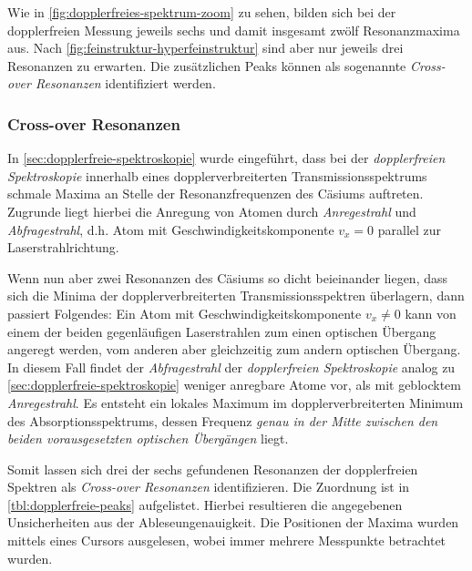 \documentclass[../bericht.tex]{subfiles}
\begin{document}
        Wie in \cref{fig:dopplerfreies-spektrum-zoom} zu sehen, bilden sich bei der dopplerfreien Messung jeweils sechs und damit insgesamt zw\"olf Resonanzmaxima aus. Nach \cref{fig:feinstruktur-hyperfeinstruktur} sind aber nur jeweils drei Resonanzen zu erwarten. Die zus\"atzlichen Peaks k\"onnen als sogenannte \textit{Cross-over Resonanzen} identifiziert werden.


        \subsubsection{Cross-over Resonanzen}
        \label{subsec:cross-over-resonanzen}

          In \cref{sec:dopplerfreie-spektroskopie} wurde eingef\"uhrt, dass bei der \textit{dopplerfreien Spektroskopie} innerhalb eines dopplerverbreiterten Transmissionsspektrums schmale Maxima an Stelle der Resonanzfrequenzen des C\"asiums auftreten. Zugrunde liegt hierbei die Anregung von Atomen durch \textit{Anregestrahl} und \textit{Abfragestrahl}, d.h. Atom mit Geschwindigkeitskomponente $v_x=0$ parallel zur Laserstrahlrichtung.

          Wenn nun aber zwei Resonanzen des C\"asiums so dicht beieinander liegen, dass sich die Minima der dopplerverbreiterten Transmissionsspektren \"uberlagern, dann passiert Folgendes: Ein Atom mit Geschwindigkeitskomponente $v_x\ne 0$ kann von einem der beiden gegenl\"aufigen Laserstrahlen zum einen optischen \"Ubergang angeregt werden, vom anderen aber gleichzeitig zum andern optischen \"Ubergang. In diesem Fall findet der \textit{Abfragestrahl} der \textit{dopplerfreien Spektroskopie} analog zu \cref{sec:dopplerfreie-spektroskopie} weniger anregbare Atome vor, als mit geblocktem \textit{Anregestrahl}. Es entsteht ein lokales Maximum im dopplerverbreiterten Minimum des Absorptionsspektrums, dessen Frequenz \textit{genau in der Mitte zwischen den beiden vorausgesetzten optischen \"Uberg\"angen} liegt.

          Somit lassen sich drei der sechs gefundenen Resonanzen der dopplerfreien Spektren als \textit{Cross-over Resonanzen} identifizieren. Die Zuordnung ist in \cref{tbl:dopplerfreie-peaks} aufgelistet. Hierbei resultieren die angegebenen Unsicherheiten aus der Ableseungenauigkeit. Die Positionen der Maxima wurden mittels eines Cursors ausgelesen, wobei immer mehrere Messpunkte betrachtet wurden.
\end{document}
